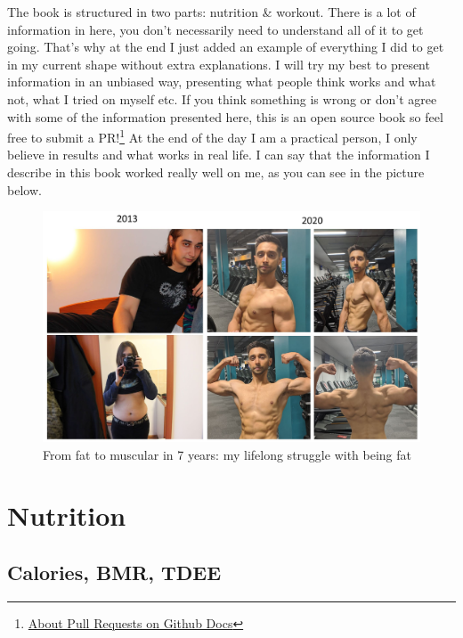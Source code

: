 \documentclass[openany, 12pt]{book}
\begin{document}
	The book is structured in two parts: nutrition \& workout. There is a lot of information in here, you don't necessarily need to understand all of it
	to get going. That's why at the end I just added an example of everything I did to get in my current shape without extra explanations. I will try 
	my best to present information in an unbiased way, presenting what people think works and what not, what I tried on myself etc. If you think 
	something is wrong or don't agree with some of the information presented here, this is an open source book so feel free to submit a 
	PR!\footnote{\href{https://docs.github.com/en/free-pro-team@latest/github/collaborating-with-issues-and-pull-requests/about-pull-requests}
	{About Pull Requests on Github Docs}} At the end of the day I am a practical person, I only believe in results and what works in real life. 
	I can say that the information I describe in this book worked really well on me, as you can see in the picture below.
	
	\begin{figure}[h]
		\centering
		\includegraphics[scale=0.2]{transformation.jpg}
		\caption{From fat to muscular in 7 years: my lifelong struggle with being fat}
		\label{fig1}
	\end{figure}
	
	
  \chapter{Nutrition}
  
  	\section{Calories, BMR, TDEE}
  	
\end{document}
